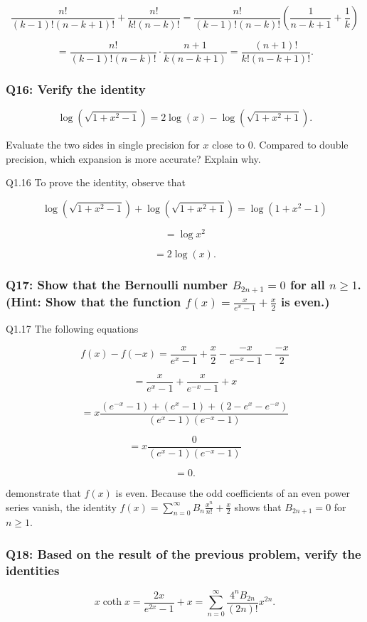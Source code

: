 \documentclass[8pt]{article}
\begin{document}
\[
\frac{n!}{(k - 1)!(n - k + 1)!} + \frac{n!}{k!(n - k)!} = \frac{n!}{(k - 1)!(n - k)!} \left( \frac{1}{n - k + 1} + \frac{1}{k} \right)
\]

\[
= \frac{n!}{(k - 1)!(n - k)!} \cdot \frac{n + 1}{k(n - k + 1)} = \frac{(n + 1)!}{k!(n - k + 1)!}.
\]

\subsubsection*{Q16: Verify the identity}
\[
\log(\sqrt{1 + x^2 - 1}) = 2\log(x) - \log(\sqrt{1 + x^2 + 1}).
\]

Evaluate the two sides in single precision for \(x\) close to 0. Compared to double precision, which expansion is more accurate? Explain why.

Q1.16 To prove the identity, observe that

\[
\log(\sqrt{1 + x^2 - 1}) + \log(\sqrt{1 + x^2 + 1}) = \log(1 + x^2 - 1)
\]

\[
= \log x^2
\]

\[
= 2 \log(x).
\]

\subsubsection*{Q17: Show that the Bernoulli number \(B_{2n+1} = 0\) for all \(n \geq 1\). (Hint: Show that the function \(f(x) = \frac{x}{e^x - 1} + \frac{x}{2}\) is even.)}

Q1.17 The following equations

\[
f(x) - f(-x) = \frac{x}{e^x - 1} + \frac{x}{2} - \frac{-x}{e^{-x} - 1} - \frac{-x}{2}
\]

\[
= \frac{x}{e^x - 1} + \frac{x}{e^{-x} - 1} + x
\]

\[
= x \frac{(e^{-x} - 1) + (e^x - 1) + (2 - e^x - e^{-x})}{(e^x - 1)(e^{-x} - 1)}
\]

\[
= x \frac{0}{(e^x - 1)(e^{-x} - 1)}
\]

\[
= 0.
\]

demonstrate that \(f(x)\) is even. Because the odd coefficients of an even power series vanish, the identity \(f(x) = \sum_{n=0}^{\infty} B_n \frac{x^n}{n!} + \frac{x}{2}\) shows that \(B_{2n+1} = 0\) for \(n \geq 1\).

\subsubsection*{Q18: Based on the result of the previous problem, verify the identities}
\[
x \coth x = \frac{2x}{e^{2x} - 1} + x = \sum_{n=0}^{\infty} \frac{4^n B_{2n}}{(2n)!} x^{2n}.
\]
\end{document}
